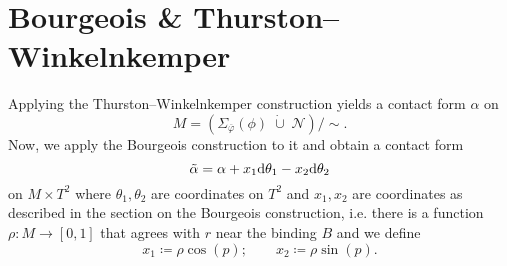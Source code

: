 \section*{Bourgeois \& Thurston--Winkelnkemper}
Applying the Thurston--Winkelnkemper construction yields a contact form $\alpha$ on
\[
    M = \left(\Sigma_{\overline{\varphi}}(\phi)\; \dot\cup\; \mathcal{N}\right)/\sim.
\]
Now, we apply the Bourgeois construction to it and obtain a contact form
\[
    \tilde \alpha = \alpha + x_1 \mathrm{d} \theta_1 - x_2 \mathrm{d}\theta_2
\]
on $M \times T^2$ where $\theta_1, \theta_2$ are coordinates on $T^2$
and $x_1, x_2$ are coordinates as described in the section on the Bourgeois construction, i.e. there is a function $\rho: M \to [0,1]$ that agrees with $r$ near the binding $B$ and we define
\[
    x_1 \coloneqq \rho \cos(p);\qquad x_2 \coloneqq \rho \sin(p).
\]

